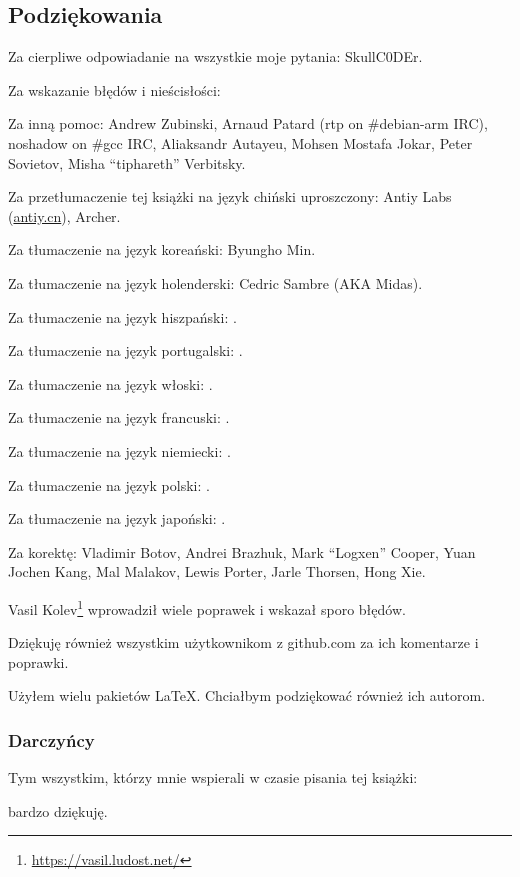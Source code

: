 \subsection*{Podziękowania}

Za cierpliwe odpowiadanie na wszystkie moje pytania: SkullC0DEr.

Za wskazanie błędów i nieścisłości: \PeopleMistakesInaccuracies{}

Za inną pomoc:
Andrew Zubinski,
Arnaud Patard (rtp on \#debian-arm IRC),
noshadow on \#gcc IRC,
Aliaksandr Autayeu,
Mohsen Mostafa Jokar,
Peter Sovietov,
Misha ``tiphareth'' Verbitsky.

Za przetłumaczenie tej książki na język chiński uproszczony:
Antiy Labs (\href{http://antiy.cn}{antiy.cn}), Archer.

Za tłumaczenie na język koreański: Byungho Min.

Za tłumaczenie na język holenderski: Cedric Sambre (AKA Midas).

Za tłumaczenie na język hiszpański: \PeopleSpanishTranslators{}.

Za tłumaczenie na język portugalski: \PeoplePTBRTranslators{}.

Za tłumaczenie na język włoski: \PeopleItalianTranslators{}.

Za tłumaczenie na język francuski: \PeopleFrenchTranslators{}.

Za tłumaczenie na język niemiecki: \PeopleGermanTranslators{}.

Za tłumaczenie na język polski: \PeoplePolishTranslators{}.

Za tłumaczenie na język japoński: \PeopleJapaneseTranslators{}.

Za korektę:
Vladimir Botov,
Andrei Brazhuk,
Mark ``Logxen'' Cooper, Yuan Jochen Kang, Mal Malakov, Lewis Porter, Jarle Thorsen, Hong Xie.

Vasil Kolev\footnote{\url{https://vasil.ludost.net/}} wprowadził wiele poprawek i wskazał sporo błędów.

Dziękuję również wszystkim użytkownikom z github.com za ich komentarze i poprawki.

Użyłem wielu pakietów \LaTeX. Chciałbym podziękować również ich autorom.

\subsubsection*{Darczyńcy}

Tym wszystkim, którzy mnie wspierali w czasie pisania tej książki:



bardzo dziękuję.
